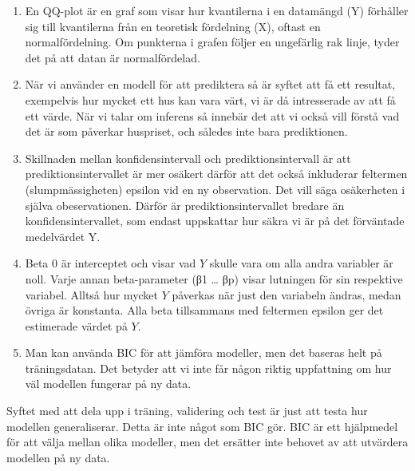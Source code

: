 \documentclass[
  letterpaper,
  DIV=11,
  numbers=noendperiod]{scrreprt}
\begin{document}
\begin{enumerate}
\def\labelenumi{\arabic{enumi}.}
\item
  En QQ-plot är en graf som visar hur kvantilerna i en datamängd (Y)
  förhåller sig till kvantilerna från en teoretisk fördelning (X),
  oftast en normalfördelning. Om punkterna i grafen följer en ungefärlig
  rak linje, tyder det på att datan är normalfördelad.
\item
  När vi använder en modell för att prediktera så är syftet att få ett
  resultat, exempelvis hur mycket ett hus kan vara värt, vi är då
  intresserade av att få ett värde. När vi talar om inferens så innebär
  det att vi också vill förstå vad det är som påverkar huspriset, och
  således inte bara prediktionen.
\item
  Skillnaden mellan konfidensintervall och prediktionsintervall är att
  prediktionsintervallet är mer osäkert därför att det också inkluderar
  feltermen (slumpmässigheten) epsilon vid en ny observation. Det vill
  säga osäkerheten i själva obeservationen. Därför är
  prediktionsintervallet bredare än konfidensintervallet, som endast
  uppskattar hur säkra vi är på det förväntade medelvärdet Y.
\item
  Beta 0 är interceptet och visar vad \(Y\) skulle vara om alla andra
  variabler är noll. Varje annan beta-parameter (β1 \ldots{} βp) visar
  lutningen för sin respektive variabel. Alltså hur mycket \(Y\)
  påverkas när just den variabeln ändras, medan övriga är konstanta.
  Alla beta tillsammans med feltermen epsilon ger det estimerade värdet
  på \(Y\).
\item
  Man kan använda BIC för att jämföra modeller, men det baseras helt på
  träningsdatan. Det betyder att vi inte får någon riktig uppfattning om
  hur väl modellen fungerar på ny data.
\end{enumerate}

Syftet med att dela upp i träning, validering och test är just att testa
hur modellen generaliserar. Detta är inte något som BIC gör. BIC är ett
hjälpmedel för att välja mellan olika modeller, men det ersätter inte
behovet av att utvärdera modellen på ny data.
\end{document}
